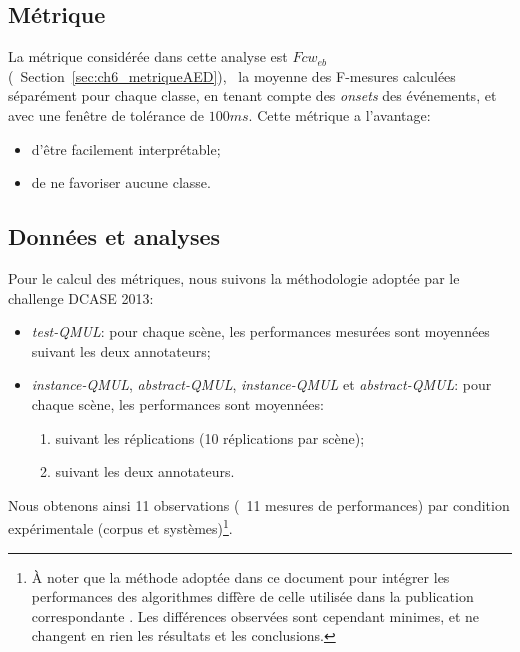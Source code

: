 \subsection{Métrique}

La métrique considérée dans cette analyse est $Fcw_{eb}$ (\cf~Section~\ref{sec:ch6_metriqueAED}), \ie~la moyenne des F-mesures calculées séparément pour chaque classe, en tenant compte des \emph{onsets} des événements, et avec une fenêtre de tolérance de $100ms$. Cette métrique a l'avantage: 

\begin{itemize}
\item d'être facilement interprétable;
\item de ne favoriser aucune classe.
\end{itemize}

\subsection{Données et analyses}

Pour le calcul des métriques, nous suivons la méthodologie adoptée par le challenge DCASE 2013:

\begin{itemize}

\item \emph{test-QMUL}: pour chaque scène, les performances mesurées sont moyennées suivant les deux annotateurs;
\item  \emph{instance-QMUL}, \emph{abstract-QMUL},  \emph{instance-QMUL} et \emph{abstract-QMUL}: pour chaque scène, les performances sont moyennées:

\begin{enumerate}
\item suivant les réplications (10 réplications par scène);
\item suivant les deux annotateurs.
\end{enumerate}

\end{itemize}

Nous obtenons ainsi 11 observations (\ie~11 mesures de performances) par condition expérimentale (corpus et systèmes)\footnote{À noter que la méthode adoptée dans ce document pour intégrer les performances des algorithmes diffère de celle utilisée dans la publication correspondante \citep{lafay2016morphological}. Les différences observées sont cependant minimes, et ne changent en rien les résultats et les conclusions.}.

